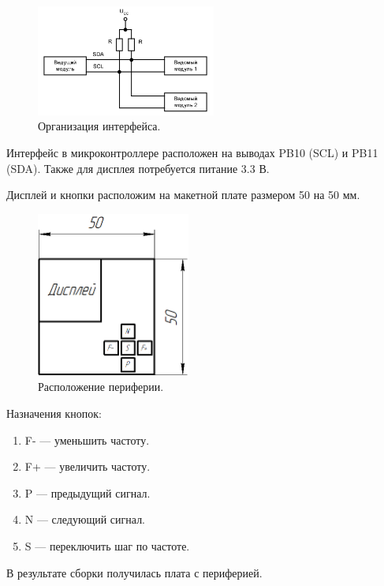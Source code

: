 	\begin{figure}[H]
    \centering
    \includegraphics[width=0.525\textwidth]{../image/i2c.png}
    \caption{Организация интерфейса.}
	\end{figure}
	
	Интерфейс в микроконтроллере расположен на выводах PB10 (SCL) и PB11 (SDA). Также для дисплея потребуется питание 3.3 В.
	
	Дисплей и кнопки расположим на макетной плате размером 50 на 50 мм.
	
	\begin{figure}[H]
    \centering
    \includegraphics[width=0.45\textwidth]{../image/func_gen.png}
    \caption{Расположение периферии.}
	\end{figure}
	
	Назначения кнопок:
	\begin{enumerate}
	\item F- --- уменьшить частоту.
	\item F+ --- увеличить частоту.
	\item P --- предыдущий сигнал.
	\item N --- следующий сигнал.
	\item S --- переключить шаг по частоте.
	\end{enumerate}
	
	В результате сборки получилась плата с периферией.

